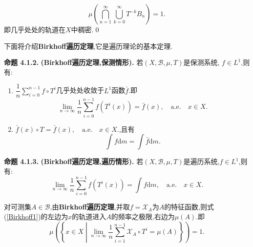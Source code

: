 $$\mu\left(\bigcap_{n=1}^{\infty}\bigcup_{k=0}^{\infty}T^{-k}B_n\right)=1.$$
即几乎处处的轨道在$X$中稠密.\qed
\par
下面将介绍\textbf{Birkhoff遍历定理},它是遍历理论的基本定理.\par
\textbf{命题 4.1.2.  }\textsuperscript{\cite{Ergodic_Sun,Ergodic_theory}}\textbf{(Birkhoff遍历定理,保测情形).  }
若$(X,\mathcal{B},\mu,T)$是保测系统, $f\in L^1$,则有:
\begin{enumerate}
    \item $\dfrac{1}{n}\sum\limits_{i=0}^{n-1}f\circ T^{i}$几乎处处收敛于$L^1$函数$\bar f$.即
    $$\lim_{n\to\infty}\frac{1}{n}\sum\limits_{i=0}^{n-1}f(T^{i}(x))=\bar f(x),\quad \mathrm{a.e.}\quad x\in X.$$
    \item $\bar f(x)\circ T=\bar f(x),\quad \mathrm{a.e.}\quad x\in X.$,且有
    $$\int f\mathrm{d}m =\int \bar f\mathrm{d}m.$$
\end{enumerate}
\par
\textbf{命题 4.1.3.  }\textsuperscript{\cite{Ergodic_Sun,Ergodic_theory}}\textbf{(Birkhoff遍历定理,遍历情形).  }
若$(X,\mathcal{B},\mu,T)$是遍历系统,$f\in L^1$,则有:
\begin{equation}\label{Birkhoff1}
\lim_{n\to\infty}\frac{1}{n}\sum\limits_{i=0}^{n-1}f(T^{i}(x))=\int f\mathrm{d}m,\quad \mathrm{a.e.}\quad x\in X.
\end{equation}\par
对可测集$A\in\mathcal{B}$,由\textbf{Birkhoff遍历定理},并取$f=\mathcal{X}_A$为$A$的特征函数,则式(\ref{Birkhoff1})的左边为$x$的轨道进入$A$的频率之极限,右边为$\mu(A)$.即
\begin{equation}\label{Birkhoff2}
\mu\left(\left\{x\in X\middle|\lim_{n\to\infty}\frac{1}{n}\sum_{i=1}^{n-1}\mathcal{X}_A\circ T^{i}=\mu(A)\right\}\right)=1.
\end{equation}
